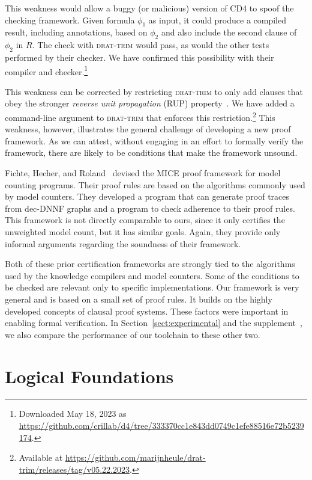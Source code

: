 \documentclass[letterpaper,USenglish,cleveref, autoref, thm-restate]{lipics-v2021}
\newcommand{\progname}[1]{\textsc{#1}}
\newcommand{\cdfour}{\progname{CD4}}
\newcommand{\dtrim}{\progname{drat-trim}}
\begin{document}
This weakness would allow a buggy (or malicious) version of \cdfour{}
to spoof the checking framework.  Given formula $\phi_1$ as input, it
could produce a compiled result, including annotations, based on $\phi_2$ and also include the second clause of $\phi_2$ in $R$.
The check with \dtrim{} would pass, as would the other tests performed
by their checker.  We have confirmed this possibility with
their compiler and checker.\footnote{Downloaded May 18, 2023 as\\
\url{https://github.com/crillab/d4/tree/333370cc1e843dd0749c1efe88516e72b5239174}.}


This weakness can be corrected by restricting \dtrim{} to only add
clauses that obey the stronger \emph{reverse unit propagation} (RUP) property~\cite{goldberg,vangelder08_verifying_rup_proofs}.  We have added a
command-line argument to \dtrim{} that enforces this
restriction.\footnote{Available at
\url{https://github.com/marijnheule/drat-trim/releases/tag/v05.22.2023}.}  This weakness, however, illustrates the general challenge of
developing a new proof framework.
As we can attest,
without engaging in an effort to formally verify the framework, there are likely to be
conditions that make the framework unsound.

Fichte, Hecher, and Roland~\cite{fichte:sat:2022} devised the MICE
proof framework for model counting programs.  Their proof rules are
based on the algorithms commonly used by model counters.  They
developed a program that can generate proof traces from dec-DNNF
graphs and a program to check adherence to their proof rules.  This
framework is not directly comparable to ours, since it only certifies
the unweighted model count, but it has similar goals.
Again, they provide only  informal arguments
regarding the soundness of their framework.

Both of these prior certification frameworks are strongly tied to the
algorithms used by the knowledge compilers and model counters.  Some
of the conditions to be checked are relevant only to specific
implementations.    Our framework is very general and is based on a small set
of proof rules.  It builds on the highly developed
concepts of clausal proof systems.  These factors were important in enabling formal verification.
In Section~\ref{sect:experimental} and the supplement~\cite{bryant:sat:2023:supplement},
we also compare the performance of our toolchain to these other two.


\section{Logical Foundations}
\label{section:logical:foundations}
\end{document}
